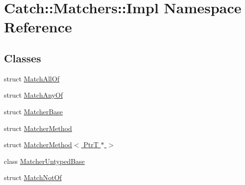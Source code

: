 \hypertarget{namespace_catch_1_1_matchers_1_1_impl}{}\section{Catch\+:\+:Matchers\+:\+:Impl Namespace Reference}
\label{namespace_catch_1_1_matchers_1_1_impl}
\subsection*{Classes}
\begin{DoxyCompactItemize}
\item 
struct \hyperlink{struct_catch_1_1_matchers_1_1_impl_1_1_match_all_of}{Match\+All\+Of}
\item 
struct \hyperlink{struct_catch_1_1_matchers_1_1_impl_1_1_match_any_of}{Match\+Any\+Of}
\item 
struct \hyperlink{struct_catch_1_1_matchers_1_1_impl_1_1_matcher_base}{Matcher\+Base}
\item 
struct \hyperlink{struct_catch_1_1_matchers_1_1_impl_1_1_matcher_method}{Matcher\+Method}
\item 
struct \hyperlink{struct_catch_1_1_matchers_1_1_impl_1_1_matcher_method_3_01_ptr_t_01_5_01_4}{Matcher\+Method$<$ Ptr\+T $\ast$ $>$}
\item 
class \hyperlink{class_catch_1_1_matchers_1_1_impl_1_1_matcher_untyped_base}{Matcher\+Untyped\+Base}
\item 
struct \hyperlink{struct_catch_1_1_matchers_1_1_impl_1_1_match_not_of}{Match\+Not\+Of}
\end{DoxyCompactItemize}
